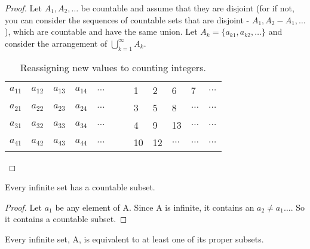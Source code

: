 \documentclass[11pt,fleqn]{book} %
\begin{document}
\begin{proof}
	Let $A_1, A_2, \dots$ be countable and assume that they are disjoint (for if not, you can consider the sequences of countable sets that are disjoint - $A_1, A_2-A_1, \dots$), which are countable and have the same union. 
	Let $A_k = \{a_{k1}, a_{k2}, \dots\}$ and consider the arrangement of $\bigcup\limits_{k=1}^\infty A_k$.
		
		\begin{table}[h]
			\centering
			\begin{tabular}{l l l l l l l l l l l l}
			$a_{11}$ & $a_{12}$ & $a_{13}$ & $a_{14}$ & $\dots$ & 	 & 	 & 1 & 2 & 6 & 7 & $\dots$  \\
			$a_{21}$ & $a_{22}$ & $a_{23}$ & $a_{24}$ & $\dots$ & 	 & 	 & 3 & 5 & 8 & $\dots $ & $\dots$  \\
			$a_{31}$ & $a_{32}$ & $a_{33}$ & $a_{34}$ & $\dots$ & 	 & 	 & 4 & 9 & 13 & $\dots $ & $\dots$  \\
			$a_{41}$ & $a_{42}$ & $a_{43}$ & $a_{44}$ & $\dots$ & 	 & 	 & 10 & 12 & $\dots$ & $\dots $ & $\dots$  \\
			\end{tabular}
			\caption{Reassigning new values to counting integers.}
			\end{table}

\end{proof}

\begin{theorem}
	Every infinite set has a countable subset.
\end{theorem}

\begin{proof}
	Let $a_1$ be any element of A. Since A is infinite, it contains an $a_2 \neq a_1 \dots$. So it contains a countable subset.
\end{proof}

\begin{theorem}
	Every infinite set, A, is equivalent to at least one of its proper subsets.
\end{theorem}
\end{document}
